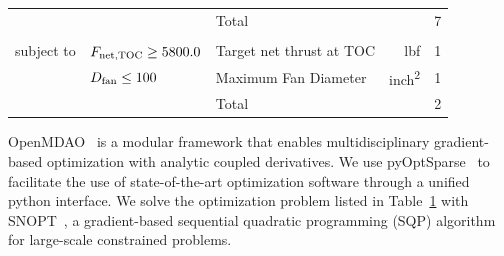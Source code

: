\documentclass[conf]{new-aiaa}
\begin{document}
\begin{table}[hbt!]
\begin{tabular}{r l l r l}
        \cline{3-5}
                        &                                & Total                                                                 &                & 7        \\
                        &                                &                                                                       &                &          \\
        subject to      & $F_{\rm{net,TOC}} \geq 5800.0$ & Target net thrust at TOC                                              & \si{lbf}       & 1        \\
                        & $D_{\rm{fan}} \leq 100$        & Maximum Fan Diameter                                                  & \si{inch^2}    & 1        \\
        \cline{3-5}
                        &                                & Total                                                                 &                & 2        \\
        \bottomrule
    \end{tabular}
    \label{tab:opt_problem}
\end{table}

OpenMDAO~\cite{Gray2019a} is a modular framework that enables multidisciplinary gradient-based optimization with analytic coupled derivatives.
We use pyOptSparse~\cite{Wu2020a} to facilitate the use of state-of-the-art optimization software through a unified python interface.
We solve the optimization problem listed in Table~\ref{tab:opt_problem} with SNOPT~\cite{Gill2005a}, a gradient-based sequential quadratic programming (SQP) algorithm for large-scale constrained problems.

\end{document}
